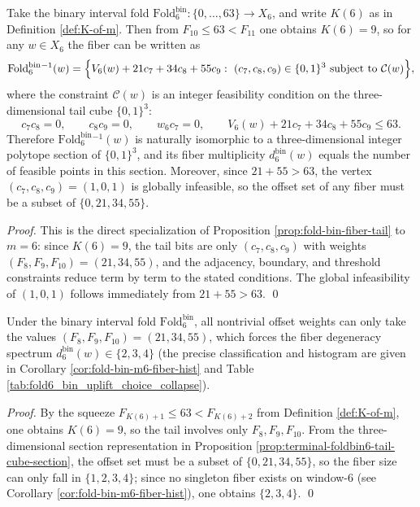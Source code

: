 
\begin{proposition}\label{prop:terminal-foldbin6-tail-cube-section}
Take the binary interval fold \(\mathrm{Fold}^{\mathrm{bin}}_6:\{0,\dots,63\}\to X_6\), and write \(K(6)\) as in Definition \ref{def:K-of-m}.
Then from \(F_{10}\le 63<F_{11}\) one obtains \(K(6)=9\), so for any \(w\in X_6\) the fiber can be written as
\[
\mathrm{Fold}^{\mathrm{bin}}_6{}^{-1}(w)
=
\Bigl\{
V_6(w)+21c_7+34c_8+55c_9:\ (c_7,c_8,c_9)\in\{0,1\}^3\ \text{subject to}\ \mathcal{C}(w)
\Bigr\},
\]
where the constraint \(\mathcal{C}(w)\) is an integer feasibility condition on the three-dimensional tail cube \(\{0,1\}^3\):
\[
c_7c_8=0,\qquad c_8c_9=0,\qquad w_6c_7=0,\qquad V_6(w)+21c_7+34c_8+55c_9\le 63.
\]
Therefore \(\mathrm{Fold}^{\mathrm{bin}}_6{}^{-1}(w)\) is naturally isomorphic to a three-dimensional integer polytope section of \(\{0,1\}^3\), and its fiber multiplicity \(d^{\mathrm{bin}}_6(w)\) equals the number of feasible points in this section.
Moreover, since \(21+55>63\), the vertex \((c_7,c_8,c_9)=(1,0,1)\) is globally infeasible, so the offset set of any fiber must be a subset of \(\{0,21,34,55\}\).
\end{proposition}
\begin{proof}
This is the direct specialization of Proposition \ref{prop:fold-bin-fiber-tail} to \(m=6\): since \(K(6)=9\), the tail bits are only \((c_7,c_8,c_9)\) with weights \((F_8,F_9,F_{10})=(21,34,55)\), and the adjacency, boundary, and threshold constraints reduce term by term to the stated conditions.
The global infeasibility of \((1,0,1)\) follows immediately from \(21+55>63\). \qed
\end{proof}

\begin{corollary}\label{cor:terminal-foldbin6-three-offset-rigidity}
Under the binary interval fold \(\mathrm{Fold}^{\mathrm{bin}}_6\), all nontrivial offset weights can only take the values \((F_8,F_9,F_{10})=(21,34,55)\), which forces the fiber degeneracy spectrum \(d^{\mathrm{bin}}_6(w)\in\{2,3,4\}\) (the precise classification and histogram are given in Corollary \ref{cor:fold-bin-m6-fiber-hist} and Table \ref{tab:fold6_bin_uplift_choice_collapse}).
\end{corollary}
\begin{proof}
By the squeeze \(F_{K(6)+1}\le 63<F_{K(6)+2}\) from Definition \ref{def:K-of-m}, one obtains \(K(6)=9\), so the tail involves only \(F_8,F_9,F_{10}\).
From the three-dimensional section representation in Proposition \ref{prop:terminal-foldbin6-tail-cube-section}, the offset set must be a subset of \(\{0,21,34,55\}\), so the fiber size can only fall in \(\{1,2,3,4\}\); since no singleton fiber exists on window-\(6\) (see Corollary \ref{cor:fold-bin-m6-fiber-hist}), one obtains \(\{2,3,4\}\). \qed
\end{proof}

